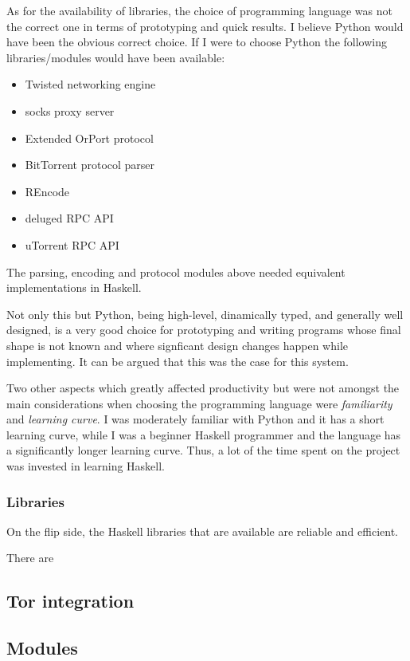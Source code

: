 \documentclass[11pt]{article} %
\begin{document}
As for the availability of libraries, the choice of programming language was not the correct one in terms of prototyping and quick results. I believe Python would have been the obvious correct choice. If I were to choose Python the following libraries/modules would have been available:

\begin{itemize}
\item Twisted networking engine 
\item socks proxy server
\item Extended OrPort protocol  
\item BitTorrent protocol parser
\item REncode
\item deluged RPC API 
\item uTorrent RPC API
\end{itemize}

The parsing, encoding and protocol modules above needed equivalent implementations in Haskell. 

Not only this but Python, being high-level, dinamically typed, and generally well designed, is a very good choice for prototyping and writing programs whose final shape is not known and where signficant design changes happen while implementing. It can be argued that this was the case for this system.

Two other aspects which greatly affected productivity but were not amongst the main considerations when choosing the programming language were \textit{familiarity} and \textit{learning curve}. I was moderately familiar with Python and it has a short learning curve, while I was a beginner Haskell programmer and the language has a significantly longer learning curve. Thus, a lot of the time spent on the project was invested in learning Haskell.



\subsubsection{Libraries}

On the flip side, the Haskell libraries that are available are reliable and efficient.

There are  

\subsection{Tor integration}
\subsection{Modules}
\end{document}
